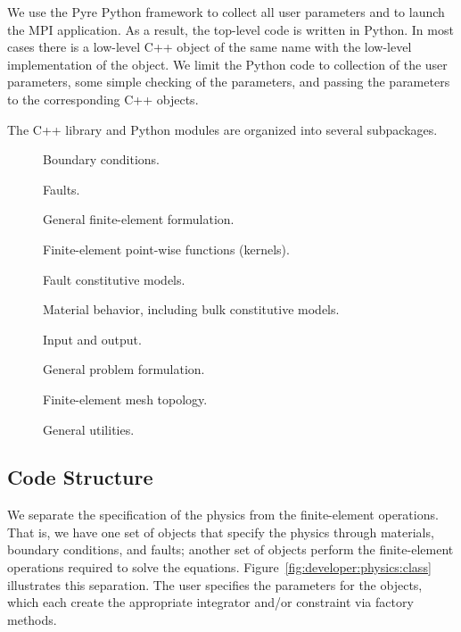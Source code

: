 We use the Pyre Python framework to collect all user parameters and to
launch the MPI application. As a result, the top-level code is written
in Python. In most cases there is a low-level C++ object of the same
name with the low-level implementation of the object. We limit the
Python code to collection of the user parameters, some simple
checking of the parameters, and passing the parameters to the
corresponding C++ objects.

The C++ library and Python modules are organized into several
subpackages.

\begin{description}
\item[] Boundary conditions.
\item[] Faults.
\item[] General finite-element formulation.
\item[] Finite-element point-wise functions (kernels).
\item[] Fault constitutive models.
\item[] Material behavior, including bulk constitutive models.
\item[] Input and output.
\item[] General problem formulation.
\item[] Finite-element mesh topology.
\item[] General utilities.
\end{description}

\subsection{Code Structure}
\label{sec:code:structure}

We separate the specification of the physics from the finite-element
operations. That is, we have one set of objects that specify the
physics through materials, boundary conditions, and faults; another
set of objects perform the finite-element operations required to solve
the equations. Figure~\vref{fig:developer:physics:class} illustrates
this separation. The user specifies the parameters for the
 objects, which each create the appropriate integrator
and/or constraint via factory methods.

